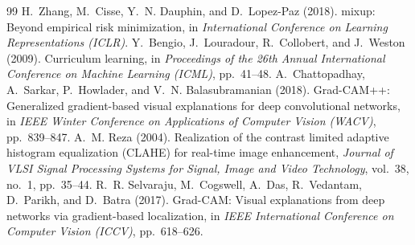 \documentclass[12pt,a4paper]{report}
\begin{document}
\begin{thebibliography}{99}
H.~Zhang, M.~Cisse, Y.~N. Dauphin, and D.~Lopez-Paz (2018). mixup: Beyond empirical risk minimization, in \textit{International Conference on Learning Representations (ICLR)}.
Y.~Bengio, J.~Louradour, R.~Collobert, and J.~Weston (2009). Curriculum learning, in \textit{Proceedings of the 26th Annual International Conference on Machine Learning (ICML)}, pp.~41--48.
A.~Chattopadhay, A.~Sarkar, P.~Howlader, and V.~N. Balasubramanian (2018). Grad-CAM++: Generalized gradient-based visual explanations for deep convolutional networks, in \textit{IEEE Winter Conference on Applications of Computer Vision (WACV)}, pp.~839--847.
A.~M. Reza (2004). Realization of the contrast limited adaptive histogram equalization (CLAHE) for real-time image enhancement, \textit{Journal of VLSI Signal Processing Systems for Signal, Image and Video Technology}, vol.~38, no.~1, pp.~35--44.
R.~R. Selvaraju, M.~Cogswell, A.~Das, R.~Vedantam, D.~Parikh, and D.~Batra (2017). Grad-CAM: Visual explanations from deep networks via gradient-based localization, in \textit{IEEE International Conference on Computer Vision (ICCV)}, pp.~618--626.
\end{thebibliography}
\end{document}
